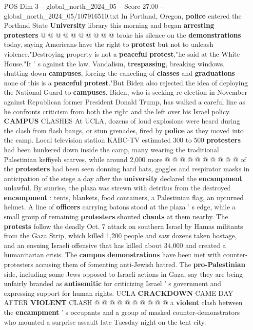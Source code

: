 \begin{textsample}{POS Dim 3 – global\_north\_2024\_05 – Score 27.00 – global\_north\_2024\_05/107916510.txt}
In Portland, Oregon, \textbf{police} entered the Portland State \textbf{University} library this morning and began \textbf{arresting} \textbf{protesters} @ @ @ @ @ @ @ @ @ @ broke his silence on the \textbf{demonstrations} today, saying Americans have the right to \textbf{protest} but not to unleash violence."Destroying property is not a \textbf{peaceful} \textbf{protest},"he said at the White House."It ' s against the law.
Vandalism, \textbf{trespassing}, breaking windows, shutting down \textbf{campuses}, forcing the canceling of \textbf{classes} and \textbf{graduations} -- none of this is a \textbf{peaceful} \textbf{protest}."But Biden also rejected the idea of deploying the National Guard to \textbf{campuses}.
Biden, who is seeking re-election in November against Republican former President Donald Trump, has walked a careful line as he confronts criticism from both the right and the left over his Israel policy. \textbf{CAMPUS} CLASHES At UCLA, dozens of loud explosions were heard during the clash from flash bangs, or stun grenades, fired by \textbf{police} as they moved into the camp.
Local television station KABC-TV estimated 300 to 500 \textbf{protesters} had been hunkered down inside the camp, many wearing the traditional Palestinian keffiyeh scarves, while around 2,000 more @ @ @ @ @ @ @ @ @ @ of the \textbf{protesters} had been seen donning hard hats, goggles and respirator masks in anticipation of the siege a day after the \textbf{university} declared the \textbf{encampment} unlawful.
By sunrise, the plaza was strewn with detritus from the destroyed \textbf{encampment} : tents, blankets, food containers, a Palestinian flag, an upturned helmet.
A line of \textbf{officers} carrying batons stood at the plaza ' s edge, while a small group of remaining \textbf{protesters} shouted \textbf{chants} at them nearby.
The \textbf{protests} follow the deadly Oct. 7 attack on southern Israel by Hamas militants from the Gaza Strip, which killed 1,200 people and saw dozens taken hostage, and an ensuing Israeli offensive that has killed about 34,000 and created a humanitarian crisis.
The \textbf{campus} \textbf{demonstrations} have been met with counter-protesters accusing them of fomenting anti-Jewish hatred.
The \textbf{pro-Palestinian} side, including some Jews opposed to Israeli actions in Gaza, say they are being unfairly branded as \textbf{antisemitic} for criticizing Israel ' s government and expressing support for human rights.
UCLA \textbf{CRACKDOWN} CAME DAY AFTER \textbf{VIOLENT} CLASH @ @ @ @ @ @ @ @ @ @ a \textbf{violent} clash between the \textbf{encampment} ' s occupants and a group of masked counter-demonstrators who mounted a surprise assault late Tuesday night on the tent city.

\end{textsample}

